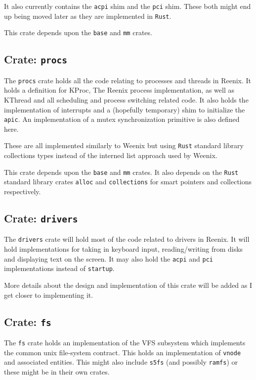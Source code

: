 \documentclass[12pt,letterpaper]{article}
\newcommand{\rust}{\texttt{Rust}}
\begin{document}
It also currently contains the \texttt{acpi} shim and the \texttt{pci}
shim. These both might end up being moved later as they are implemented in \rust{}.

This crate depends upon the \texttt{base} and \texttt{mm} crates.

\subsection{Crate: \texttt{procs}}
The \texttt{procs} crate holds all the code relating to processes and
threads in Reenix. It holds a definition for KProc, The Reenix process
implementation, as well as KThread and all scheduling and process
switching related code. It also holds the implementation of interrupts
and a (hopefully temporary) shim to initialize the \texttt{apic}. An
implementation of a mutex synchronization primitive is also defined here.

These are all implemented similarly to Weenix but using \rust{} standard
library collections types instead of the interned list approach used
by Weenix.

This crate depends upon the \texttt{base} and \texttt{mm} crates. It
also depends on the \rust{} standard library crates \texttt{alloc}
and \texttt{collections} for smart pointers and collections respectively.

\subsection{Crate: \texttt{drivers}}
The \texttt{drivers} crate will hold most of the code related to drivers
in Reenix. It will hold implementations for taking in keyboard input,
reading/writing from disks and displaying text on the screen. It may
also hold the \texttt{acpi} and \texttt{pci} implementations instead
of \texttt{startup}.

More details about the design and implementation of this crate will be
added as I get closer to implementing it.

\subsection{Crate: \texttt{fs}}
The \texttt{fs} crate holds an implementation of the VFS subsystem
which implements the common unix file-system contract. This holds an
implementation of \texttt{vnode} and associated entities. This might
also include \texttt{s5fs} (and possibly \texttt{ramfs}) or these might
be in their own crates.
\end{document}
